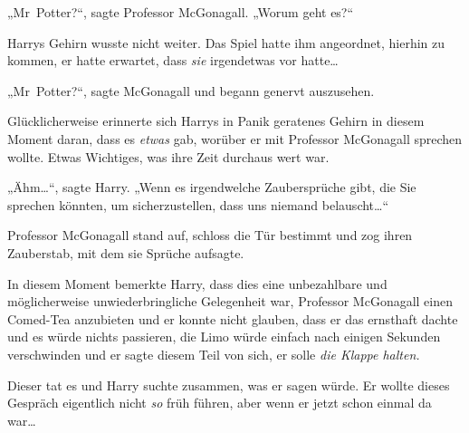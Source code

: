 „Mr~Potter?“, sagte Professor McGonagall. „Worum geht es?“

Harrys Gehirn wusste nicht weiter. Das Spiel hatte ihm angeordnet, hierhin zu kommen, er hatte erwartet, dass \emph{sie} irgendetwas vor hatte…

„Mr~Potter?“, sagte McGonagall und begann genervt auszusehen.

Glücklicherweise erinnerte sich Harrys in Panik geratenes Gehirn in diesem Moment daran, dass es \emph{etwas} gab, worüber er mit Professor McGonagall sprechen wollte. Etwas Wichtiges, was ihre Zeit durchaus wert war.

„Ähm…“, sagte Harry. „Wenn es irgendwelche Zaubersprüche gibt, die Sie sprechen könnten, um sicherzustellen, dass uns niemand belauscht…“

Professor McGonagall stand auf, schloss die Tür bestimmt und zog ihren Zauberstab, mit dem sie Sprüche aufsagte.

In diesem Moment bemerkte Harry, dass dies eine unbezahlbare und möglicherweise unwiederbringliche Gelegenheit war, Professor McGonagall einen Comed-Tea anzubieten und er konnte nicht glauben, dass er das ernsthaft dachte und es würde nichts passieren, die Limo würde einfach nach einigen Sekunden verschwinden und er sagte diesem Teil von sich, er solle \emph{die Klappe halten.}

Dieser tat es und Harry suchte zusammen, was er sagen würde. Er wollte dieses Gespräch eigentlich nicht \emph{so} früh führen, aber wenn er jetzt schon einmal da war…

